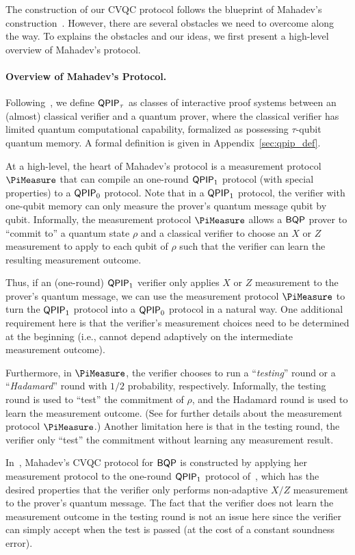 The construction of our CVQC protocol follows the blueprint of Mahadev's construction~\cite{FOCS:Mahadev18a}. However, there are several obstacles we need to overcome along the way. To explains the obstacles and our ideas, we first present a high-level overview of Mahadev's protocol.

\paragraph{Overview of Mahadev's Protocol.}
Following~\cite{FOCS:Mahadev18a}, we define $\operatorname{\mathsf{QPIP}}_{\tau}$ as classes of interactive proof systems between an (almost) classical verifier and a quantum prover, where the classical verifier has limited quantum computational capability, formalized as possessing $\tau$-qubit quantum memory.
A formal definition is given in Appendix~\ref{sec:qpip_def}. 

At a high-level, the heart of Mahadev's protocol is a measurement protocol $\PiMeasure$ that can compile an one-round $\operatorname{\mathsf{QPIP}}_1$ protocol (with special properties) to a $\operatorname{\mathsf{QPIP}}_0$ protocol. Note that in a $\operatorname{\mathsf{QPIP}}_1$ protocol, the verifier with one-qubit memory can only measure the prover's quantum message qubit by qubit. Informally, the measurement protocol $\PiMeasure$ allows a $\operatorname{\mathsf{BQP}}$ prover to ``commit to'' a quantum state $\rho$ and a classical verifier to choose an $X$ or $Z$ measurement to apply to each qubit of $\rho$ such that the verifier can learn the resulting measurement outcome. 

Thus, if an (one-round) $\operatorname{\mathsf{QPIP}}_1$ verifier only applies $X$ or $Z$ measurement to the prover's quantum message, we can use the measurement protocol $\PiMeasure$ to turn the $\operatorname{\mathsf{QPIP}}_1$ protocol into a $\operatorname{\mathsf{QPIP}}_0$ protocol in a natural way. One additional requirement here is that the verifier's measurement choices need to be determined at the beginning (i.e., cannot depend adaptively on the intermediate measurement outcome). 

Furthermore, in $\PiMeasure$, the verifier chooses to run a ``\emph{testing}'' round or a ``\emph{Hadamard}'' round with $1/2$ probability, respectively. Informally, the testing round is used to ``test'' the commitment of $\rho$, and the Hadamard round is used to learn the measurement outcome. (See  for further details about the measurement protocol $\PiMeasure$.) Another limitation here is that in the testing round, the verifier only ``test'' the commitment without learning any measurement result. 

In~\cite{FOCS:Mahadev18a}, Mahadev's CVQC protocol for $\operatorname{\mathsf{BQP}}$ is constructed by applying her measurement protocol to the one-round $\operatorname{\mathsf{QPIP}}_1$ protocol of~\cite{PhysRevA.93.022326, mf16}, which has the desired properties that the verifier only performs non-adaptive $X/Z$ measurement to the prover's quantum message. The fact that the verifier does not learn the measurement outcome in the testing round is not an issue here since the verifier can simply accept when the test is passed (at the cost of a constant soundness error).

